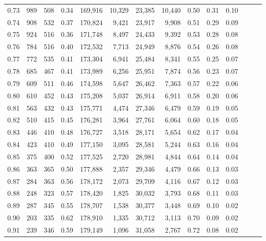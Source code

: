 \begin{tabular}{rrrrrrrrrrrrrr}
0.73 &    989 &  508 &  0.34 &  169,916 &   10,329 &  23,385 &  10,440 &  0.50 &  0.31 &      0.10 \\
0.74 &    908 &  532 &  0.37 &  170,824 &    9,421 &  23,917 &   9,908 &  0.51 &  0.29 &      0.09 \\
0.75 &    924 &  516 &  0.36 &  171,748 &    8,497 &  24,433 &   9,392 &  0.53 &  0.28 &      0.08 \\
0.76 &    784 &  516 &  0.40 &  172,532 &    7,713 &  24,949 &   8,876 &  0.54 &  0.26 &      0.08 \\
0.77 &    772 &  535 &  0.41 &  173,304 &    6,941 &  25,484 &   8,341 &  0.55 &  0.25 &      0.07 \\
0.78 &    685 &  467 &  0.41 &  173,989 &    6,256 &  25,951 &   7,874 &  0.56 &  0.23 &      0.07 \\
0.79 &    609 &  511 &  0.46 &  174,598 &    5,647 &  26,462 &   7,363 &  0.57 &  0.22 &      0.06 \\
0.80 &    610 &  452 &  0.43 &  175,208 &    5,037 &  26,914 &   6,911 &  0.58 &  0.20 &      0.06 \\
0.81 &    563 &  432 &  0.43 &  175,771 &    4,474 &  27,346 &   6,479 &  0.59 &  0.19 &      0.05 \\
0.82 &    510 &  415 &  0.45 &  176,281 &    3,964 &  27,761 &   6,064 &  0.60 &  0.18 &      0.05 \\
0.83 &    446 &  410 &  0.48 &  176,727 &    3,518 &  28,171 &   5,654 &  0.62 &  0.17 &      0.04 \\
0.84 &    423 &  410 &  0.49 &  177,150 &    3,095 &  28,581 &   5,244 &  0.63 &  0.16 &      0.04 \\
0.85 &    375 &  400 &  0.52 &  177,525 &    2,720 &  28,981 &   4,844 &  0.64 &  0.14 &      0.04 \\
0.86 &    363 &  365 &  0.50 &  177,888 &    2,357 &  29,346 &   4,479 &  0.66 &  0.13 &      0.03 \\
0.87 &    284 &  363 &  0.56 &  178,172 &    2,073 &  29,709 &   4,116 &  0.67 &  0.12 &      0.03 \\
0.88 &    248 &  323 &  0.57 &  178,420 &    1,825 &  30,032 &   3,793 &  0.68 &  0.11 &      0.03 \\
0.89 &    287 &  345 &  0.55 &  178,707 &    1,538 &  30,377 &   3,448 &  0.69 &  0.10 &      0.02 \\
0.90 &    203 &  335 &  0.62 &  178,910 &    1,335 &  30,712 &   3,113 &  0.70 &  0.09 &      0.02 \\
0.91 &    239 &  346 &  0.59 &  179,149 &    1,096 &  31,058 &   2,767 &  0.72 &  0.08 &      0.02 \\

\end{tabular}

